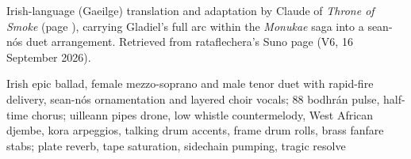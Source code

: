 
\label{sec:laoi-ghlaidial}
\begin{notes}
Irish-language (Gaeilge) translation and adaptation by Claude of \emph{Throne of Smoke} (page \pageref{sec:throne-of-smoke}), carrying Gladiel's full arc within the \emph{Monukae} saga into a sean-nós duet arrangement. Retrieved from rataflechera's Suno page (V6, 16 September 2026).
\end{notes}
\begin{style}
Irish epic ballad, female mezzo-soprano and male tenor duet with rapid-fire delivery, sean-nós ornamentation and layered choir vocals; 88 bodhrán pulse, half-time chorus; uilleann pipes drone, low whistle countermelody, West African djembe, kora arpeggios, talking drum accents, frame drum rolls, brass fanfare stabs; plate reverb, tape saturation, sidechain pumping, tragic resolve
\end{style}

